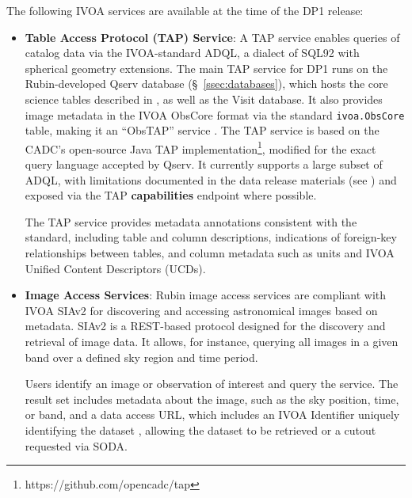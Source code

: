 The following \gls{IVOA} services are available at the time of the \gls{DP1} release:
\begin{itemize}
\vspace{0.1cm}
\item \textbf{Table Access Protocol (TAP) Service}: A TAP service \citep{2019ivoa.spec.0927D} enables queries of catalog data via the IVOA-standard \gls{ADQL}, a dialect of SQL92 with spherical geometry extensions.
The main \gls{TAP} service for \gls{DP1} runs on the Rubin-developed \gls{Qserv} database (\S~\ref{ssec:databases}), which hosts the core science tables described in , as well as the Visit database.
It also provides image metadata in the IVOA ObsCore format via the standard \texttt{ivoa.ObsCore} table, making it an ``ObsTAP'' service \citep[ObsTAP;][]{2017ivoa.spec.0509L}.
The TAP service is based on the \gls{CADC}'s open-source Java TAP implementation\footnote{https://github.com/opencadc/tap}, modified for the exact query language accepted by Qserv.
It currently supports a large subset of ADQL, with limitations documented in the data release materials (see ) and exposed via the TAP \textbf{capabilities} endpoint where possible. \

The TAP service provides metadata annotations consistent with the standard, including table and column descriptions, indications of foreign-key relationships between tables, and column metadata such as units and \gls{IVOA} Unified Content Descriptors (UCDs).

\vspace{0.1cm}
\item \textbf{Image Access Services}: Rubin image access services are compliant with \gls{IVOA} SIAv2 \citep[Simple Image Access Protocol, version 2;][]{2025arXiv250100544J,2015ivoa.spec.1223D}
for discovering and accessing astronomical images based on \gls{metadata}.
SIAv2 is a \gls{REST}-based protocol designed for the discovery and retrieval of image data. It allows, for instance, querying all images in a given band over a defined sky region and time period.

Users identify an image or observation of interest and query the service.
The result set includes \gls{metadata} about the image, such as the sky position, time, or band, and a data access URL, which includes an IVOA Identifier uniquely identifying the dataset \citep{DMTN-302}, allowing the dataset to be retrieved or a cutout requested via \gls{SODA}.


\end{itemize}
